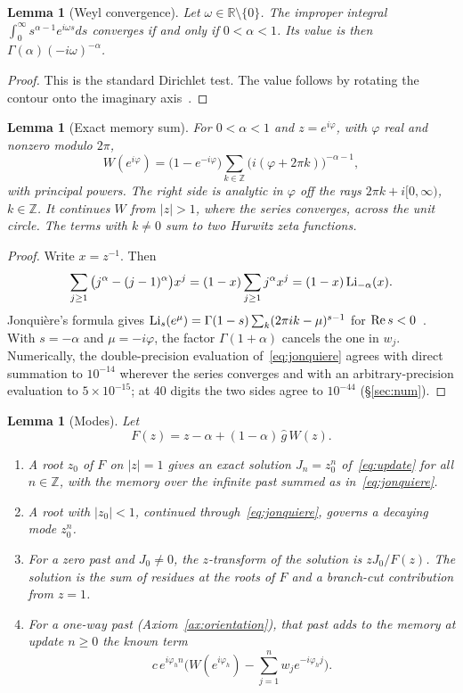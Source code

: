\documentclass[11pt]{amsart}
\newtheorem{lemma}[theorem]{Lemma}
\theoremstyle{definition}
\theoremstyle{remark}
\begin{document}
\begin{lemma}[Weyl convergence]\label{lem:weyl}
Let $\omega\in\mathbb R\setminus\{0\}$. The improper integral $\int_0^\infty s^{\alpha-1}e^{i\omega s}ds$ converges if and only if $0<\alpha<1$. Its value is then $\Gamma(\alpha)(-i\omega)^{-\alpha}$.
\end{lemma}

\begin{proof}
This is the standard Dirichlet test. The value follows by rotating the contour onto the imaginary axis~\cite{SKM}.
\end{proof}

\begin{lemma}[Exact memory sum]\label{lem:W}
For $0<\alpha<1$ and $z=e^{i\varphi}$, with $\varphi$ real and nonzero modulo $2\pi$,
\begin{equation}\label{eq:jonquiere}
W(e^{i\varphi})=\big(1-e^{-i\varphi}\big)\sum_{k\in\mathbb Z}\big(i(\varphi+2\pi k)\big)^{-\alpha-1},
\end{equation}
with principal powers. The right side is analytic in $\varphi$ off the rays $2\pi k+i[0,\infty)$, $k\in\mathbb Z$. It continues $W$ from $\lvert z\rvert>1$, where the series converges, across the unit circle. The terms with $k\ne0$ sum to two Hurwitz zeta functions.
\end{lemma}

\begin{proof}
Write $x=z^{-1}$. Then
\[
\sum_{j\ge1}\big(j^\alpha-(j-1)^\alpha\big)x^j=(1-x)\sum_{j\ge1}j^\alpha x^j=(1-x)\,{\rm Li}_{-\alpha}(x).
\]
Jonqui\`ere's formula gives ${\rm Li}_s(e^\mu)=\Gamma(1-s)\sum_k(2\pi ik-\mu)^{s-1}$ for ${\rm Re}\,s<0$~\cite{Lewin,DLMF}. With $s=-\alpha$ and $\mu=-i\varphi$, the factor $\Gamma(1+\alpha)$ cancels the one in $w_j$. Numerically, the double-precision evaluation of~\eqref{eq:jonquiere} agrees with direct summation to $10^{-14}$ wherever the series converges and with an arbitrary-precision evaluation to $5\times10^{-15}$; at $40$ digits the two sides agree to $10^{-44}$ (\S\ref{sec:num}).
\end{proof}

\begin{lemma}[Modes]\label{lem:modes}
Let
\[
F(z)=z-\alpha+(1-\alpha)\,\hat g\,W(z).
\]
\begin{enumerate}
\item A root $z_0$ of $F$ on $\lvert z\rvert=1$ gives an exact solution $J_n=z_0^n$ of~\eqref{eq:update} for all $n\in\mathbb Z$, with the memory over the infinite past summed as in~\eqref{eq:jonquiere}.
\item A root with $\lvert z_0\rvert<1$, continued through~\eqref{eq:jonquiere}, governs a decaying mode $z_0^n$.
\item For a zero past and $J_0\ne0$, the $z$-transform of the solution is $zJ_0/F(z)$. The solution is the sum of residues at the roots of $F$ and a branch-cut contribution from $z=1$.
\item For a one-way past (Axiom~\ref{ax:orientation}), that past adds to the memory at update $n\ge0$ the known term
\[
c\,e^{i\varphi_hn}\Big(W(e^{i\varphi_h})-\sum_{j=1}^nw_je^{-i\varphi_hj}\Big).
\]
\end{enumerate}
\end{lemma}
\end{document}
